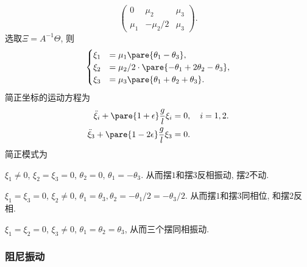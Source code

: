 \documentclass{ctexart}
\begin{document}
\begin{sample}
\begin{ex}
\[\begin{pmatrix}
            0 & \mu_2 & \mu_3 \\
            \mu_1 & -\mu_2/2 & \mu_3
        \end{pmatrix}. \]
        选取$\Xi = A^{-1}\Theta$, 则
        \[ \begin{cases}
            \xi_1 &= \mu_1 \pare{\theta_1 - \theta_3}, \\
            \xi_2 &= \mu_2/2\cdot \pare{-\theta_1 + 2\theta_2 - \theta_3}, \\
            \xi_3 &= \mu_3 \pare{\theta_1 + \theta_2 + \theta_3}.
        \end{cases} \]
        简正坐标的运动方程为
        \begin{align*}
            \ddot{\xi}_i + \pare{1+\epsilon} \frac{g}{l} \xi_i &= 0,\quad i = 1,2. \\
            \ddot{\xi}_3 + \pare{1-2\epsilon} \frac{g}{l} \xi_3 &= 0.
        \end{align*}
        简正模式为
        \begin{cenum}
            \item $\xi_1 \neq 0$, $\xi_2 = \xi_3= 0$, $\theta_2 = 0$, $\theta_1 = -\theta_3$. 从而摆$1$和摆$3$反相振动, 摆$2$不动.
            \item $\xi_1 = \xi_3 = 0$, $\xi_2 \neq 0$, $\theta_1 = \theta_3,\theta_2 = -\theta_1/2 = -\theta_3/2$. 从而摆$1$和摆$3$同相位, 和摆$2$反相.
            \item $\xi_1 = \xi_2 = 0$, $\xi_3 \neq 0$, $\theta_1=\theta_2=\theta_3$, 从而三个摆同相振动.
        \end{cenum}
    \end{ex}
\end{sample}



\subsubsection{阻尼振动} %
\label{ssub:阻尼振动}
\end{document}

